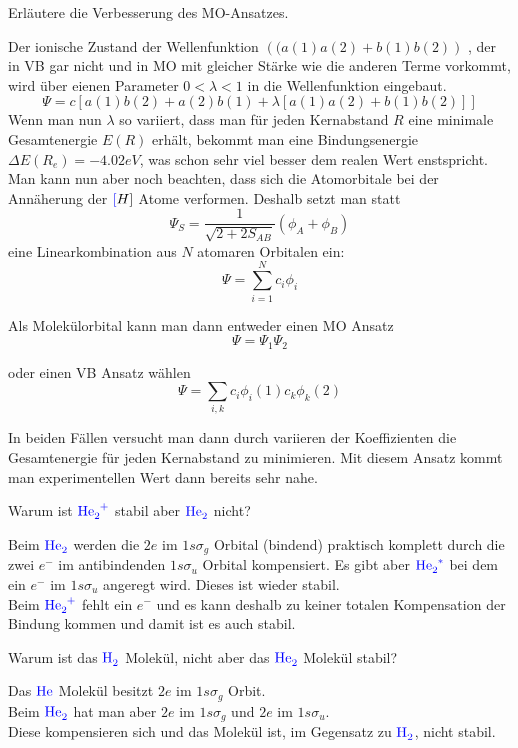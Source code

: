 \documentclass[a5paper,12pt,ngerman,print,grid=front]{kartei}
\let\oldce\ce
\renewcommand*{\ce}[1]{\begingroup\color{blue}\oldce{#1}\endgroup}
\begin{document}
	
	\begin{karte}{
		Erläutere die Verbesserung des MO-Ansatzes.
		}

		Der ionische Zustand der Wellenfunktion $\left(  (a(1)a(2) + b(1)b(2) \right) $
		, der in VB gar nicht und in MO mit gleicher Stärke wie die anderen Terme vorkommt, wird über eienen Parameter $ 0 < \lambda < 1 $ in die Wellenfunktion eingebaut.
		$$ \Psi = c[ a(1)b(2) + a(2)b(1) + \lambda[ a(1)a(2) + b(1)b(2) ] ] $$
		Wenn man nun $\lambda$ so variiert, dass man für jeden Kernabstand $R$ eine minimale Gesamtenergie $E(R)$ erhält, bekommt man eine Bindungsenergie $ \Delta E(R_e) = -4.02eV $, was schon sehr viel besser dem realen Wert enstspricht.
		Man kann nun aber noch beachten, dass sich die Atomorbitale bei der Annäherung der $\ce[H]$ Atome verformen. Deshalb setzt man statt 
		$$ \Psi_S = \frac{1}{\sqrt{2+2S_{AB}}} (\phi_A + \phi_B) $$
		eine Linearkombination aus $N$ atomaren Orbitalen ein:
		$$ \Psi = \sum_{i=1}^{N} c_i\phi_i $$
		
		Als Molekülorbital kann man dann entweder einen MO Ansatz $$\Psi = \Psi_1 \Psi_2$$
		
		oder einen VB Ansatz wählen $$ \Psi = \sum_{i,k} c_i\phi_i(1)c_k\phi_k(2) $$
		
		In beiden Fällen versucht man dann durch variieren der Koeffizienten die Gesamtenergie für jeden Kernabstand zu minimieren. Mit diesem Ansatz kommt man experimentellen Wert dann bereits sehr nahe.
		
	\end{karte}
	
	
	\begin{karte}{
		Warum ist $\ce{He2+}$ stabil aber $\ce{He2}$ nicht?
		}
		
		Beim $\ce{He2}$ werden die $2e$ im $1s \sigma_g$ Orbital (bindend) praktisch komplett durch die zwei $e^-$ im antibindenden $1s\sigma_u$ Orbital kompensiert. 
		Es gibt aber $\ce{He2^*}$ bei dem ein $e^-$ im $1s\sigma_u$ angeregt wird. 
		Dieses ist wieder stabil. \\
		
		Beim $\ce{He2^+}$ fehlt ein $e^-$ und es kann deshalb zu keiner totalen Kompensation der Bindung kommen und damit ist es auch stabil.
				
	\end{karte}


	\begin{karte}{
		Warum ist das $\ce{H2}$ Molekül, nicht aber das $\ce{He2}$ Molekül stabil?
		}
		
		Das $\ce{He}$ Molekül besitzt $2e$ im $1s\sigma_g$ Orbit. \\
		Beim $ \ce{He2} $ hat man aber $2e$ im $1s \sigma_g$ und $2e$ im $1s\sigma_u$. \\
		Diese kompensieren sich und das Molekül ist, im Gegensatz zu $\ce{H2}$, nicht stabil.
		
	\end{karte}
\end{document}
